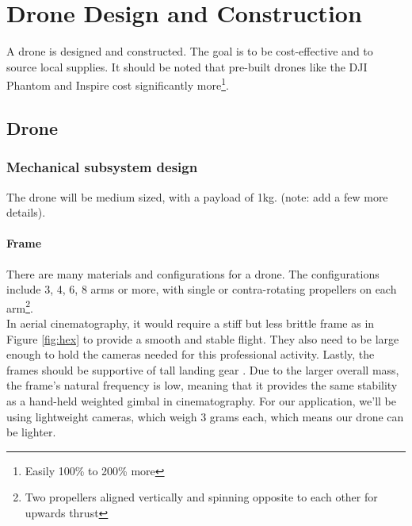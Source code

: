 \chapter{Drone Design and Construction}

A drone is designed and constructed. The goal is to be cost-effective and to source local supplies. It should be noted that pre-built drones like the DJI Phantom and Inspire cost significantly more\footnote{Easily 100\% to 200\% more}.

\section{Drone}

\subsection{Mechanical subsystem design}

The drone will be medium sized, with a payload of 1kg. (note: add a few more details).

\subsubsection{Frame}

There are many materials and configurations for a drone. The configurations include 3, 4, 6, 8 arms or more, with single or contra-rotating propellers on each arm\footnote{Two propellers aligned vertically and spinning opposite to each other for upwards thrust}. \\

In aerial cinematography, it would require a stiff but less brittle frame as in Figure \ref{fig:hex} to provide a smooth and stable flight. They also need to be large enough to hold the cameras needed for this professional activity. Lastly, the frames should be supportive of tall landing gear \cite{frame}. Due to the larger overall mass, the frame's natural frequency is low, meaning that it provides the same stability as a hand-held weighted gimbal in cinematography. For our application, we'll be using lightweight cameras, which weigh 3 grams each, which means our drone can be lighter.\\

